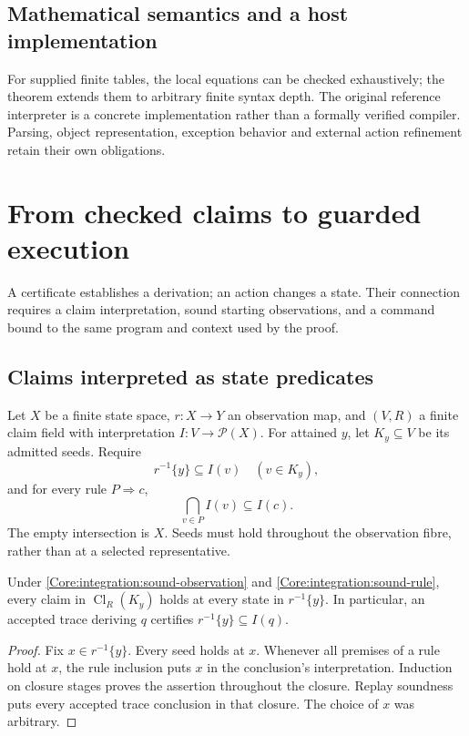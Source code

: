\section{Mathematical semantics and a host implementation}
For supplied finite tables, the local equations can be checked exhaustively; the theorem extends them to arbitrary finite syntax depth. The original reference interpreter is a concrete implementation rather than a formally verified compiler. Parsing, object representation, exception behavior and external action refinement retain their own obligations.

\chapter{From checked claims to guarded execution}\label{Core:book:chapter-17}
\setcounter{section}{0}
A certificate establishes a derivation; an action changes a state. Their connection requires a claim interpretation, sound starting observations, and a command bound to the same program and context used by the proof.

\section{Claims interpreted as state predicates}
Let $X$ be a finite state space, $r:X\to Y$ an observation map, and $(V,R)$ a finite claim field with interpretation $I:V\to\mathcal P(X)$. For attained $y$, let $K_y\subseteq V$ be its admitted seeds. Require
\begin{equation}\label{Core:integration:sound-observation}
r^{-1}\{y\}\subseteq I(v)\quad(v\in K_y),
\end{equation}
and for every rule $P\Rightarrow c$,
\begin{equation}\label{Core:integration:sound-rule}
\bigcap_{v\in P}I(v)\subseteq I(c).
\end{equation}
The empty intersection is $X$. Seeds must hold throughout the observation fibre, rather than at a selected representative.

\begin{Coretheorem}\label{Core:integration:interpreted-replay}
Under \eqref{Core:integration:sound-observation} and \eqref{Core:integration:sound-rule}, every claim in $\operatorname{Cl}_R(K_y)$ holds at every state in $r^{-1}\{y\}$. In particular, an accepted trace deriving $q$ certifies $r^{-1}\{y\}\subseteq I(q)$.
\end{Coretheorem}
\begin{proof}
Fix $x\in r^{-1}\{y\}$. Every seed holds at $x$. Whenever all premises of a rule hold at $x$, the rule inclusion puts $x$ in the conclusion's interpretation. Induction on closure stages proves the assertion throughout the closure. Replay soundness puts every accepted trace conclusion in that closure. The choice of $x$ was arbitrary.
\end{proof}

